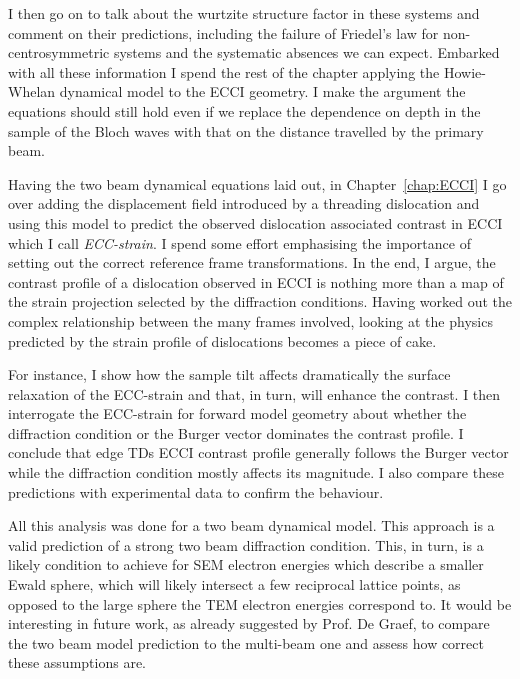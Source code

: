 I then go on to talk about the wurtzite structure factor in these systems and comment on their predictions, including the failure of Friedel's law for non-centrosymmetric systems and the systematic absences we can expect. Embarked with all these information I spend the rest of the chapter applying the Howie-Whelan dynamical model to the ECCI geometry. I make the argument the equations should still hold even if we replace the dependence on depth in the sample of the Bloch waves with that on the distance travelled by the primary beam.  

Having the two beam dynamical equations laid out, in Chapter~\ref{chap:ECCI} I go over adding the displacement field introduced by a threading dislocation and using this model to predict the observed dislocation associated contrast in ECCI which I call \textit{ECC-strain}. I spend some effort emphasising the importance of setting out the correct reference frame transformations. In the  end, I argue, the contrast profile of a dislocation observed in ECCI is nothing more than a map of the strain projection selected by the diffraction conditions. Having worked out the complex relationship between the many frames involved, looking at the physics predicted by the strain profile of dislocations becomes a piece of cake.  

For instance, I show how the sample tilt affects dramatically the surface relaxation of the ECC-strain and that, in turn, will enhance the contrast. I then interrogate the ECC-strain for forward model geometry about whether the diffraction condition or the Burger vector dominates the contrast profile. I conclude that edge TDs ECCI contrast profile generally follows the Burger vector while the diffraction condition mostly affects its magnitude. I also compare these predictions with   experimental data to confirm the behaviour.


All this analysis was done for a two beam dynamical model. This approach is a valid prediction of a strong two beam diffraction condition. This, in turn, is a likely condition to achieve for SEM electron energies which describe a smaller Ewald sphere, which will likely intersect a few reciprocal lattice points, as opposed to the large sphere the TEM electron energies correspond to. It would be interesting in future work, as already suggested by Prof. De Graef, to compare the two beam model prediction to the multi-beam one and assess how correct these assumptions are. 


